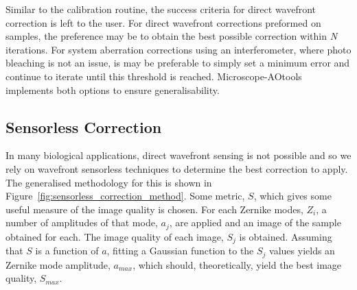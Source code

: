 Similar to the calibration routine, the success criteria for direct wavefront correction is left to the user. For direct wavefront corrections preformed on samples, the preference may be to obtain the best possible correction within \textit{N} iterations. For system aberration corrections using an interferometer, where photo bleaching is not an issue, is may be preferable to simply set a minimum error and continue to iterate until this threshold is reached. Microscope-AOtools implements both options to ensure generalisability.

\subsection{Sensorless Correction}

In many biological applications, direct wavefront sensing is not possible and so we rely on wavefront sensorless techniques to determine the best correction to apply. The generalised methodology for this is shown in Figure~\ref{fig:sensorless_correction_method}. Some metric, $S$, which gives some useful measure of the image quality is chosen. For each Zernike modes, $Z_{i}$, a number of amplitudes of that mode, $a_{j}$, are applied and an image of the sample obtained for each. The image quality of each image, $S_{j}$ is obtained. Assuming that $S$ is a function of $a$, fitting a Gaussian function to the $S_{j}$ values yields an Zernike mode amplitude, $a_{max}$, which should, theoretically, yield the best image quality, $S_{max}$. 

